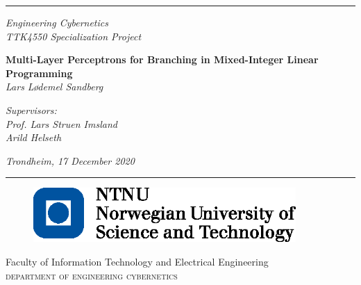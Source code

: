 \pagestyle{empty}
\newcommand{\HRule}{\rule{\linewidth}{1mm}}
 
\vspace*{-3.5cm}
\noindent\HRule
\begin{center}
 
\end{center}
\begin{center}
  \huge
	\large
	\noindent\emph{Engineering Cybernetics\\TTK4550 Specialization Project}
\end{center}
\begin{center}
 
\end{center}
\begin{center}
	\huge
	\noindent\emph{}
  \huge
  \Large
  \noindent \textbf{Multi-Layer Perceptrons for Branching in Mixed-Integer Linear Programming}
  \\ [7mm]
  \large
  \noindent\emph{Lars Lødemel Sandberg}
\end{center}
\begin{center}
  \huge
  \large
  \noindent\emph{Supervisors:\\ Prof. Lars Struen Imsland \\ Arild Helseth}
\end{center}
\begin{center}
	\large
	\noindent \emph{Trondheim, 17 December 2020}
\end{center}
\noindent\HRule
{}
\begin{figure}[h]
	\begin{center}
		\includegraphics[angle=0, width=10cm]{img/logo_ntnu}
	\end{center}
	\label{fig:logo}
\end{figure}
 
\begin{minipage}[c]{\textwidth}
	{\setlength{\baselineskip}{0.5\baselineskip}
	\small \noindent Faculty of Information Technology and Electrical Engineering\\
	\Large \noindent \textsc{department of engineering cybernetics}}
\end{minipage}
